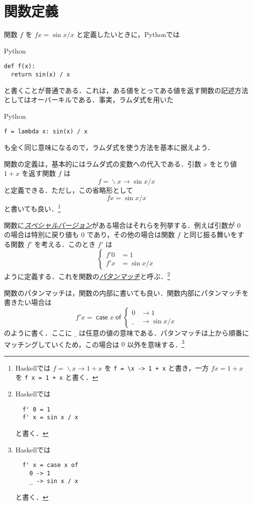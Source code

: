\documentclass[a4paper,draft]{jsbook}
\newcommand{\programminglanguage}[1]{\textsf{#1}}
\newcommand{\haskell}{\programminglanguage{Haskell}}
\newcommand{\python}{\programminglanguage{Python}}
\newcommand{\keyword}[1]{{\underline{\emph{#1}}}}
\newcommand{\code}[1]{\texttt{#1}}
\newenvironment{pythoncode}{\begin{itembox}[r]{\python}}{\end{itembox}}
\newcommand{\mKeyword}[1]{\mathsf{#1}}
\newcommand{\mCaseKeyword}{\mKeyword{case}}
\newcommand{\mOfKeyword}{\mKeyword{of}}
\newcommand{\mAnyParameter}{\_}
\DeclareMathOperator{\mLambda}{\backslash}
\DeclareMathOperator{\mLambdaArrow}{\rightarrow}
\DeclareMathOperator{\mCase}{\mCaseKeyword} %
\DeclareMathOperator{\mOf}{\mOfKeyword} %
\newcommand{\mCaseOf}[1]{\mCase{#1}\mOf}
\newcommand{\mLambdaExp}[2]{\mLambda{#1}\mLambdaArrow{#2}}
\begin{document}
\section{関数定義}

関数 $f$ を $fx=\sin x/x$ と定義したいときに，\python では
\begin{pythoncode}
\begin{verbatim}
def f(x):
  return sin(x) / x
\end{verbatim}
\end{pythoncode}
と書くことが普通である．これは，ある値をとってある値を返す関数の記述方法としてはオーバーキルである．事実，ラムダ式を用いた
\begin{pythoncode}
\begin{verbatim}
f = lambda x: sin(x) / x
\end{verbatim}
\end{pythoncode}
も全く同じ意味になるので，ラムダ式を使う方法を基本に据えよう．

関数の定義は，基本的にはラムダ式の変数への代入である．引数 $x$ をとり値 $1+x$ を返す関数 $f$ は
\begin{equation}
f=\mLambdaExp{x}{\sin x/x}
\end{equation}
と定義できる．ただし，この省略形として
\begin{equation}
fx=\sin x/x
\end{equation}
と書いても良い．\footnote{\haskell では $f=\mLambdaExp{x}{1+x}$ を \code{f = \textbackslash x -> 1 + x} と書き，一方 $fx=1+x$ を \code{f x = 1 + x} と書く．}

関数に\keyword{スペシャルバージョン}がある場合はそれらを列挙する．例えば引数が $0$ の場合は特別に戻り値も $0$ であり，その他の場合は関数 $f$ と同じ振る舞いをする関数 $f'$ を考える．このとき $f'$ は
\begin{equation}
\left\{
\begin{split}
f'0&=1\\
f'x&=\sin x/x
\end{split}
\right.
\end{equation}
ように定義する．これを関数の\keyword{パタンマッチ}と呼ぶ．\footnote{\haskell では
\begin{verbatim}
  f' 0 = 1
  f' x = sin x / x
\end{verbatim}
と書く．}

関数のパタンマッチは，関数の内部に書いても良い．関数内部にパタンマッチを書きたい場合は
\begin{equation}
f'x=\mCaseOf{x}\left\{
\begin{split}
0&\rightarrow1\\
\mAnyParameter&\rightarrow\sin x/x
\end{split}
\right.
\end{equation}
のように書く．ここに $\mAnyParameter$ は任意の値の意味である．パタンマッチは上から順番にマッチングしていくため，この場合は $0$ 以外を意味する．\footnote{\haskell では
\begin{verbatim}
  f' x = case x of
    0 -> 1
    _ -> sin x / x
\end{verbatim}
と書く．}
\end{document}
